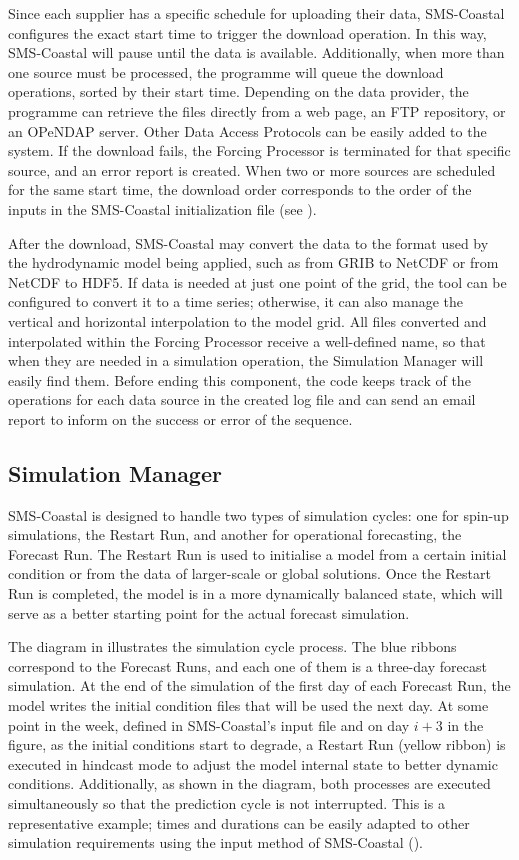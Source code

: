 Since each supplier has a specific schedule for uploading their data, SMS-Coastal configures the exact start time to trigger the download operation. In this way, SMS-Coastal will pause until the data is available. Additionally, when more than one source must be processed, the programme will queue the download operations, sorted by their start time. Depending on the data provider, the programme can retrieve the files directly from a web page, an FTP repository, or an OPeNDAP server. Other Data Access Protocols can be easily added to the system. If the download fails, the Forcing Processor is terminated for that specific source, and an error report is created. When two or more sources are scheduled for the same start time, the download order corresponds to the order of the inputs in the SMS-Coastal initialization file (see ).

After the download, SMS-Coastal may convert the data to the format used by the hydrodynamic model being applied, such as from GRIB to NetCDF or from NetCDF to HDF5. If data is needed at just one point of the grid, the tool can be configured to convert it to a time series; otherwise, it can also manage the vertical and horizontal interpolation to the model grid. All files converted and interpolated within the Forcing Processor receive a well-defined name, so that when they are needed in a simulation operation, the Simulation Manager will easily find them. Before ending this component, the code keeps track of the operations for each data source in the created log file and can send an email report to inform on the success or error of the sequence.

\subsection{Simulation Manager} \label{subsec:cp4_simmanager}
SMS-Coastal is designed to handle two types of simulation cycles: one for spin-up simulations, the Restart Run, and another for operational forecasting, the Forecast Run. The Restart Run is used to initialise a model from a certain initial condition or from the data of larger-scale or global solutions. Once the Restart Run is completed, the model is in a more dynamically balanced state, which will serve as a better starting point for the actual forecast simulation.

The diagram in  illustrates the simulation cycle process. The blue ribbons correspond to the Forecast Runs, and each one of them is a three-day forecast simulation. At the end of the simulation of the first day of each Forecast Run, the model writes the initial condition files that will be used the next day. At some point in the week, defined in SMS-Coastal's input file and on day $i + 3$ in the figure, as the initial conditions start to degrade, a Restart Run (yellow ribbon) is executed in hindcast mode to adjust the model internal state to better dynamic conditions. Additionally, as shown in the diagram, both processes are executed simultaneously so that the prediction cycle is not interrupted. This is a representative example; times and durations can be easily adapted to other simulation requirements using the input method of SMS-Coastal ().

